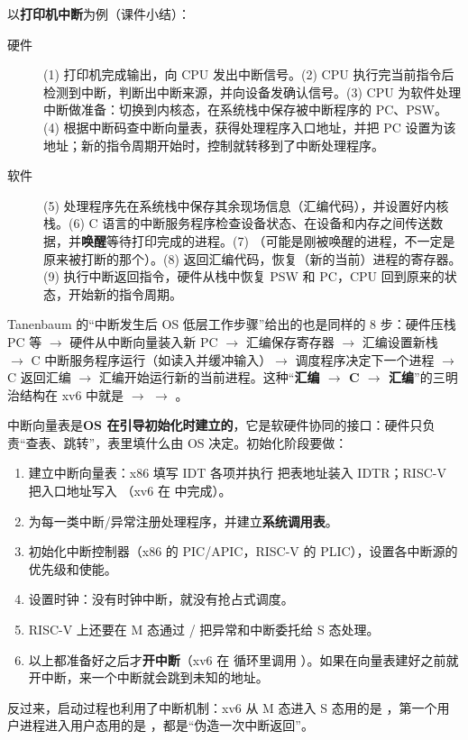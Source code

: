 以\textbf{打印机中断}为例（课件小结）：
\begin{description}
    \item[硬件] (1) 打印机完成输出，向 CPU 发出中断信号。(2) CPU 执行完当前指令后检测到中断，判断出中断来源，并向设备发确认信号。(3) CPU 为软件处理中断做准备：切换到内核态，在系统栈中保存被中断程序的 PC、PSW。(4) 根据中断码查中断向量表，获得处理程序入口地址，并把 PC 设置为该地址；新的指令周期开始时，控制就转移到了中断处理程序。
    \item[软件] (5) 处理程序先在系统栈中保存其余现场信息（汇编代码），并设置好内核栈。(6) C 语言的中断服务程序检查设备状态、在设备和内存之间传送数据，并\textbf{唤醒}等待打印完成的进程。(7) （可能是刚被唤醒的进程，不一定是原来被打断的那个）。(8) 返回汇编代码，恢复（新的当前）进程的寄存器。(9) 执行中断返回指令，硬件从栈中恢复 PSW 和 PC，CPU 回到原来的状态，开始新的指令周期。
\end{description}
Tanenbaum 的“中断发生后 OS 低层工作步骤”给出的也是同样的 8 步：硬件压栈 PC 等 $\to$ 硬件从中断向量装入新 PC $\to$ 汇编保存寄存器 $\to$ 汇编设置新栈 $\to$ C 中断服务程序运行（如读入并缓冲输入）$\to$ 调度程序决定下一个进程 $\to$ C 返回汇编 $\to$ 汇编开始运行新的当前进程。这种“\textbf{汇编 $\to$ C $\to$ 汇编}”的三明治结构在 xv6 中就是  $\to$  $\to$ 。

中断向量表是\textbf{OS 在引导初始化时建立的}，它是软硬件协同的接口：硬件只负责“查表、跳转”，表里填什么由 OS 决定。初始化阶段要做：
\begin{enumerate}
    \item 建立中断向量表：x86 填写 IDT 各项并执行  把表地址装入 IDTR；RISC-V 把入口地址写入 （xv6 在  中完成）。
    \item 为每一类中断/异常注册处理程序，并建立\textbf{系统调用表}。
    \item 初始化中断控制器（x86 的 PIC/APIC，RISC-V 的 PLIC），设置各中断源的优先级和使能。
    \item 设置时钟：没有时钟中断，就没有抢占式调度。
    \item RISC-V 上还要在 M 态通过 / 把异常和中断委托给 S 态处理。
    \item 以上都准备好之后才\textbf{开中断}（xv6 在  循环里调用 ）。如果在向量表建好之前就开中断，来一个中断就会跳到未知的地址。
\end{enumerate}
反过来，启动过程也利用了中断机制：xv6 从 M 态进入 S 态用的是 ，第一个用户进程进入用户态用的是 ，都是“伪造一次中断返回”。

